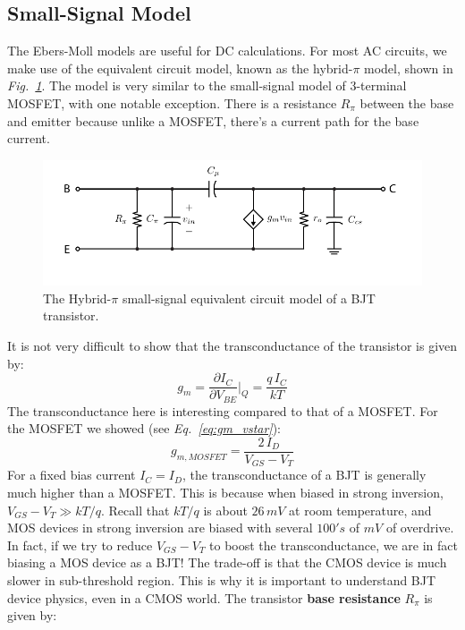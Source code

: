 \subsection{Small-Signal Model}
The Ebers-Moll models are useful for DC calculations.  For most AC circuits, we make use of the equivalent circuit model, known as the hybrid-$\pi$ model, shown in \emph{Fig.~\ref{fig:bjt_hybridpi}}.  The model is very similar to the small-signal model of 3-terminal MOSFET, with one notable exception.  There is a resistance $R_\pi$ between the base and emitter because unlike a MOSFET, there's a current path for the base current.
\begin{figure}[H]
\centering
\includegraphics[scale=1]{bjt_hybridpi}
\caption{The Hybrid-$\pi$ small-signal equivalent circuit model of a BJT transistor.} \label{fig:bjt_hybridpi}
\end{figure}
\newpage
\noindent
It is not very difficult to show that the transconductance of the transistor is given by:
    \begin{equation}
        g_m = \frac{\partial I_C}{\partial V_{BE}} \bigg\rvert_Q = \frac{q\,I_C}{kT}
    \end{equation}
The transconductance here is interesting compared to that of a MOSFET.  For the MOSFET we showed (see \emph{Eq.~\ref{eq:gm_vstar}}):
    \begin{equation}
        g_{m,MOSFET} = \frac{2\,I_D}{V_{GS} - V_T}
    \end{equation}
For a fixed bias current $I_C = I_D$, the transconductance of a BJT is generally much higher than a MOSFET.  This is because when biased in strong inversion, $V_{GS} - V_T \gg kT/q$.  Recall that $kT/q$ is about $26\,mV$ at room temperature, and MOS devices in strong inversion are biased with several $100's$ of $mV$ of overdrive.  In fact, if we try to reduce $V_{GS} - V_T$ to boost the transconductance, we are in fact biasing a MOS device as a BJT!  The trade-off is that the CMOS device is much slower in sub-threshold region.  This is why it is important to understand BJT device physics, even in a CMOS world.  The transistor \textbf{base resistance} $R_\pi$ is given by:
